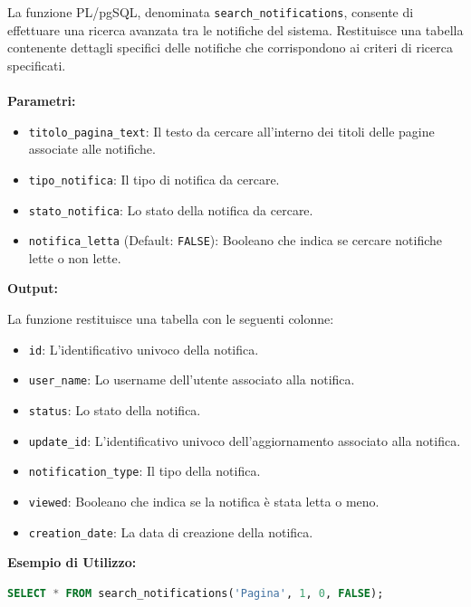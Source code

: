 \documentclass{article}
\begin{document}
    
    La funzione PL/pgSQL, denominata \texttt{search\_notifications}, consente di effettuare una ricerca avanzata tra le notifiche del sistema. Restituisce una tabella contenente dettagli specifici delle notifiche che corrispondono ai criteri di ricerca specificati.\\\\
    
    \textbf{Parametri:}
    
    \begin{itemize}
    	\item \texttt{titolo\_pagina\_text}: Il testo da cercare all'interno dei titoli delle pagine associate alle notifiche.
    	\item \texttt{tipo\_notifica}: Il tipo di notifica da cercare.
    	\item \texttt{stato\_notifica}: Lo stato della notifica da cercare.
    	\item \texttt{notifica\_letta} (Default: \texttt{FALSE}): Booleano che indica se cercare notifiche lette o non lette.
    \end{itemize}
    
    \textbf{Output:}
    
    La funzione restituisce una tabella con le seguenti colonne:
    
    \begin{itemize}
    	\item \texttt{id}: L'identificativo univoco della notifica.
    	\item \texttt{user\_name}: Lo username dell'utente associato alla notifica.
    	\item \texttt{status}: Lo stato della notifica.
    	\item \texttt{update\_id}: L'identificativo univoco dell'aggiornamento associato alla notifica.
    	\item \texttt{notification\_type}: Il tipo della notifica.
    	\item \texttt{viewed}: Booleano che indica se la notifica è stata letta o meno.
    	\item \texttt{creation\_date}: La data di creazione della notifica.
    \end{itemize}
    
    \textbf{Esempio di Utilizzo:}
    
    \begin{lstlisting}[language=SQL]
    	SELECT * FROM search_notifications('Pagina', 1, 0, FALSE);
    \end{lstlisting}
    
\end{document}
